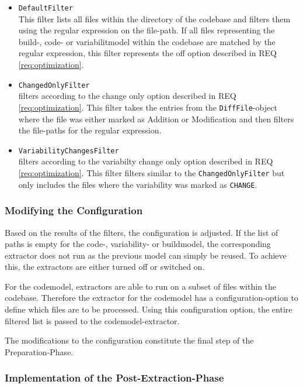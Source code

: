 \documentclass[a4paper]{article}
\begin{document}
\begin{itemize}
\item \texttt{DefaultFilter} \\
    This filter lists all files within the directory of the codebase and filters them using the regular expression on the file-path. If all files representing  the build-, code- or variabilitmodel within the codebase are matched by the regular expression, this filter represents the off option described in REQ \ref{req:optimization}. 
\item \texttt{ChangedOnlyFilter} \\
    filters according to the change only option described in REQ \ref{req:optimization}. This filter takes the entries from the \texttt{DiffFile}-object where the file was either marked as Addition or Modification and then filters the file-paths for the regular expression.
\item \texttt{VariabilityChangesFilter} \\
    filters according to the variabilty change only option described in REQ \ref{req:optimization}. This filter filters similar to the \texttt{ChangedOnlyFilter} but only includes the files where the variability was marked as \texttt{CHANGE}.
\end{itemize}

\subsubsection{Modifying the Configuration}

Based on the results of the filters, the configuration is adjusted. If the list of paths is empty for the code-, variability- or buildmodel, the corresponding extractor does not run as the previous model can simply be reused. To achieve this, the extractors are either turned off or switched on. 

For the codemodel, extractors are able to run on a subset of files within the codebase. Therefore the extractor for the codemodel has a configuration-option to define which files are to be processed. Using this configuration option, the entire filtered list is passed to the codemodel-extractor.


The modifications to the configuration constitute the final step of the Preparation-Phase.

\subsubsection{Implementation of the Post-Extraction-Phase}
\end{document}
